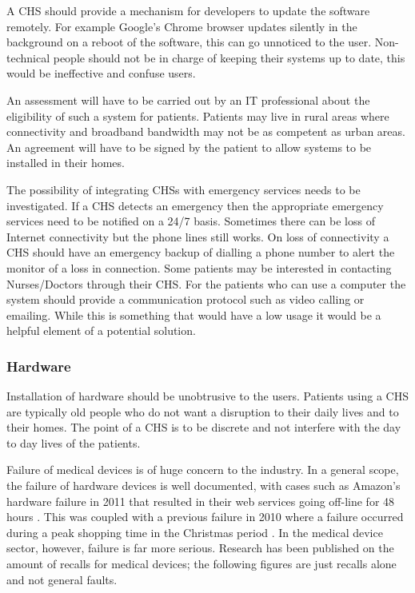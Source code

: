 A CHS should provide a mechanism for developers to update the software remotely. For example Google's Chrome browser updates silently in the background on a reboot of the software, this can go unnoticed to the user. Non-technical people should not be in charge of keeping their systems up to date, this would be ineffective and confuse users.

An assessment will have to be carried out by an IT professional about the eligibility of such a system for patients. Patients may live in rural areas where connectivity and broadband bandwidth may not be as competent as urban areas. An agreement will have to be signed by the patient to allow systems to be installed in their homes.

The possibility of integrating CHSs with emergency services needs to be investigated. If a CHS detects an emergency then the appropriate emergency services need to be notified on a 24/7 basis. Sometimes there can be loss of Internet connectivity but the phone lines still works. On loss of connectivity a CHS should have an emergency backup of dialling a phone number to alert the monitor of a loss in connection. Some patients may be interested in contacting Nurses/Doctors through their CHS. For the patients who can use a computer the system should provide a communication protocol such as video calling or emailing. While this is something that would have a low usage it would be a helpful element of a potential solution.


\subsubsection{Hardware}

Installation of hardware should be unobtrusive to the users. Patients using a CHS are typically old people who do not want a disruption to their daily lives and to their homes. The point of a CHS is to be discrete and not interfere with the day to day lives of the patients.

Failure of medical devices is of huge concern to the industry. In a general scope, the failure of hardware devices is well documented, with cases such as Amazon’s hardware failure in 2011 that resulted in their web services going off-line for 48 hours \parencite{amazon1}. This was coupled with a previous failure in 2010 where a failure occurred during a peak shopping time in the Christmas period \parencite{amazon}. In the medical device sector, however, failure is far more serious. Research has been published on the amount of recalls for medical devices; the following figures are just recalls alone and not general faults. 

